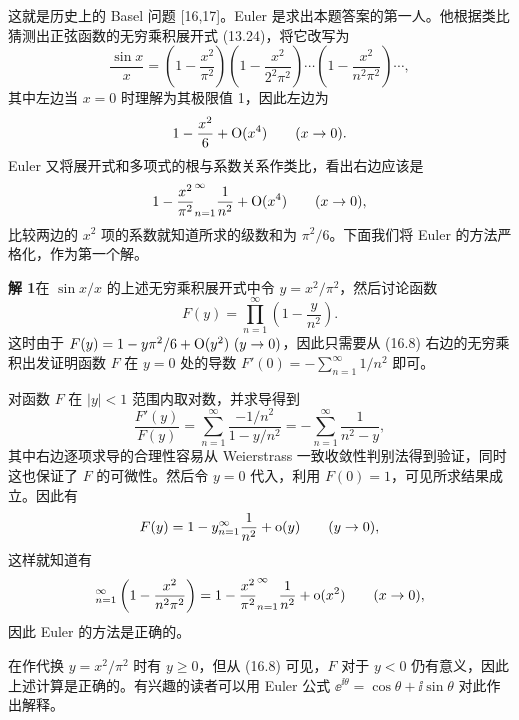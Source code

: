 这就是历史上的 Basel 问题 [16,17]。Euler 是求出本题答案的第一人。他根据类比猜测出正弦函数的无穷乘积展开式 (13.24)，将它改写为
\[
  \frac{\sin x}{x}=\left(1-\frac{x^2}{\pi^2}\right)
  \left(1-\frac{x^2}{2^2\pi^2}\right)\cdots
  \left(1-\frac{x^2}{n^2\pi^2}\right)\cdots,
\]
其中左边当 $x=0$ 时理解为其极限值 1，因此左边为
\[
  1-\frac{x^2}{6}+\mathrm{O}(x^4)\qquad(x\to0).
\]
Euler 又将展开式和多项式的根与系数关系作类比，看出右边应该是
\[
  1-\frac{x^2}{\pi^2}\relax_{n=1}^{\infty}\frac1{n^2}+\mathrm{O}(x^4)\qquad(x\to0),
\]
比较两边的 $x^2$ 项的系数就知道所求的级数和为 $\pi^2/6$。下面我们将 Euler 的方法严格化，作为第一个解。

\begin{xsolution}
\textbf{解 1}\quad 在 $\sin x/x$ 的上述无穷乘积展开式中令 $y=x^2/\pi^2$，然后讨论函数
\begin{equation}
  F(y)=\prod_{n=1}^{\infty}\left(1-\frac{y}{n^2}\right).
\tag{16.8}
\label{eq:16.8}
\end{equation}
这时由于 $F(y)=1-y\pi^2/6+\bigO(y^2)\ (y\to0)$，因此只需要从 (16.8) 右边的无穷乘积出发证明函数 $F$ 在 $y=0$ 处的导数 $F'(0)=-\sum_{n=1}^{\infty}1/n^2$ 即可。

对函数 $F$ 在 $|y|<1$ 范围内取对数，并求导得到
\[
  \frac{F'(y)}{F(y)}
  =\sum_{n=1}^{\infty}\frac{-1/n^2}{1-y/n^2}
  =-\sum_{n=1}^{\infty}\frac1{n^2-y},
\]
其中右边逐项求导的合理性容易从 Weierstrass 一致收敛性判别法得到验证，同时这也保证了 $F$ 的可微性。然后令 $y=0$ 代入，利用 $F(0)=1$，可见所求结果成立。因此有
\[
  F(y)=1-y\relax_{n=1}^{\infty}\frac1{n^2}+\mathrm{o}(y)\qquad(y\to0),
\]
这样就知道有
\[
  \relax_{n=1}^{\infty}\left(1-\frac{x^2}{n^2\pi^2}\right)
  =1-\frac{x^2}{\pi^2}\relax_{n=1}^{\infty}\frac1{n^2}+\mathrm{o}(x^2)\qquad(x\to0),
\]
因此 Euler 的方法是正确的。

\begin{xremark}
在作代换 $y=x^2/\pi^2$ 时有 $y\geqslant0$，但从 (16.8) 可见，$F$ 对于 $y<0$ 仍有意义，因此上述计算是正确的。有兴趣的读者可以用 Euler 公式 $\ee^{\ii\theta}=\cos\theta+\ii\sin\theta$ 对此作出解释。
\end{xremark}


\end{xsolution}

